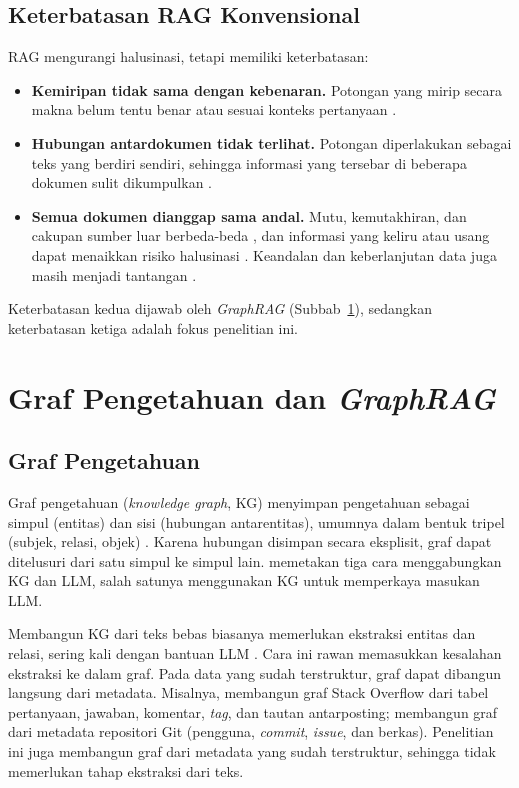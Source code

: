 \subsection{Keterbatasan RAG Konvensional}

RAG mengurangi halusinasi, tetapi memiliki keterbatasan:
\begin{itemize}
  \item \textbf{Kemiripan tidak sama dengan kebenaran.} Potongan yang mirip
secara makna belum tentu benar atau sesuai konteks pertanyaan \autocite{Kamalipour2026}.
  \item \textbf{Hubungan antardokumen tidak terlihat.} Potongan diperlakukan
sebagai teks yang berdiri sendiri, sehingga informasi yang tersebar di beberapa dokumen sulit dikumpulkan \autocite{YizhengHuang2026, Zhu2026}.
  \item \textbf{Semua dokumen dianggap sama andal.} Mutu, kemutakhiran, dan cakupan
sumber luar berbeda-beda \autocite{WangXL2026}, dan informasi yang keliru atau usang dapat menaikkan risiko halusinasi \autocite{Huang2025}. Keandalan dan keberlanjutan data juga masih menjadi tantangan \autocite{Yang2025}.
\end{itemize}
Keterbatasan kedua dijawab oleh \emph{GraphRAG} (Subbab~\ref{sec:graphrag}), sedangkan keterbatasan ketiga adalah fokus penelitian ini.

\section{Graf Pengetahuan dan \emph{GraphRAG}}
\label{sec:graphrag}

\subsection{Graf Pengetahuan}

Graf pengetahuan (\emph{knowledge graph}, KG) menyimpan pengetahuan sebagai simpul (entitas) dan sisi (hubungan antarentitas), umumnya dalam bentuk tripel (subjek, relasi, objek) \autocite{Hogan2022}. Karena hubungan disimpan secara eksplisit, graf dapat ditelusuri dari satu simpul ke simpul lain. \textcite{Pan2024} memetakan tiga cara menggabungkan KG dan LLM, salah satunya menggunakan KG untuk memperkaya masukan LLM.

Membangun KG dari teks bebas biasanya memerlukan ekstraksi entitas dan relasi, sering kali dengan bantuan LLM \autocite{Zhou2026, Cong2026, Oarga2026, Syeda2026}. Cara ini rawan memasukkan kesalahan ekstraksi ke dalam graf. Pada data yang sudah terstruktur, graf dapat dibangun langsung dari metadata. Misalnya, \textcite{Kleybolte2026} membangun graf Stack Overflow dari tabel pertanyaan, jawaban, komentar, \emph{tag}, dan tautan antarposting; \textcite{Abedu2026} membangun graf dari metadata repositori Git (pengguna, \emph{commit}, \emph{issue}, dan berkas). Penelitian ini juga membangun graf dari metadata yang sudah terstruktur, sehingga tidak memerlukan tahap ekstraksi dari teks.

